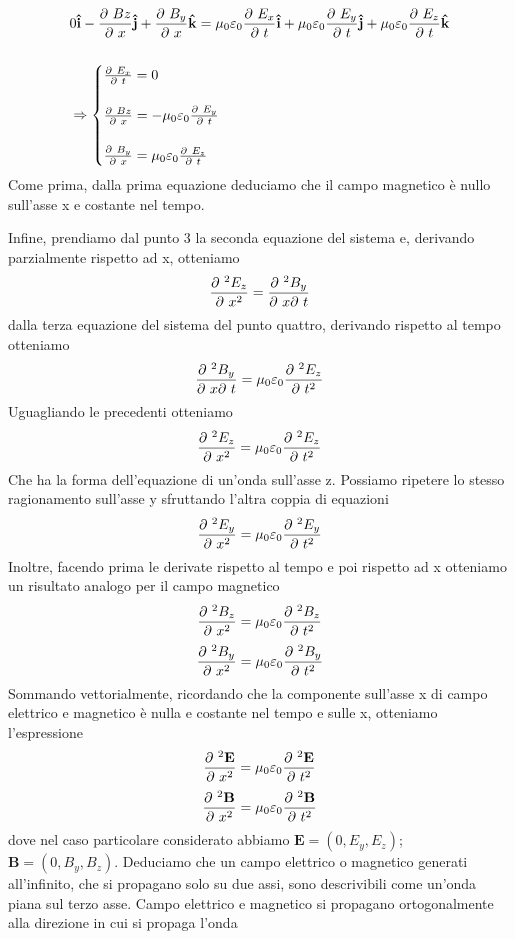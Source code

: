 \documentclass[
10pt, %
a4paper, %
oneside, %
headinclude,footinclude, %
BCOR5mm, %
]{scrartcl}
\begin{document}
\begin{itemize}
\begin{align*}
		&0\mathbf{\hat{i}}-\frac{\partial\  Bz}{\partial\  x}\mathbf{\hat{j}}+ \frac{\partial\  B_y}{\partial\  x}\mathbf{\hat{k}}=\mu_0\varepsilon_0\frac{\partial\  E_x}{\partial\  t}\mathbf{\hat{i}} + \mu_0\varepsilon_0\frac{\partial\  E_y}{\partial\  t}\mathbf{\hat{j}} +\mu_0\varepsilon_0\frac{\partial\  E_z}{\partial\  t}\mathbf{\hat{k}}\\\\
		&\Rightarrow
		\begin{cases}
			\frac{\partial\  E_x}{\partial\  t} = 0\\\\
			\frac{\partial\  Bz}{\partial\  x} = -\mu_0\varepsilon_0\frac{\partial\  E_y}{\partial\  t}\\\\
			\frac{\partial\  B_y}{\partial\  x} = \mu_0\varepsilon_0\frac{\partial\  E_z}{\partial\  t}
		\end{cases}		
	\end{align*}
	Come prima, dalla prima equazione deduciamo che il campo magnetico è nullo sull'asse x e costante nel tempo.
\end{itemize}
Infine, prendiamo dal punto 3 la seconda equazione del sistema e, derivando parzialmente rispetto ad x, otteniamo
\[\frac{\partial\ ^2 E_z}{\partial\  x^2} = \frac{\partial\ ^2 B_y}{\partial\  x\partial\  t} \]
dalla terza equazione del sistema del punto quattro, derivando rispetto al tempo otteniamo
\[\frac{\partial\ ^2 B_y}{\partial\  x\partial\  t} = \mu_0\varepsilon_0 \frac{\partial\ ^2 E_z}{\partial\  t^2}\] 
Uguagliando le precedenti otteniamo
\[\frac{\partial\ ^2 E_z}{\partial\  x^2}=\mu_0\varepsilon_0 \frac{\partial\ ^2 E_z}{\partial\  t^2}\]
Che ha la forma dell'equazione di un'onda sull'asse z. Possiamo ripetere lo stesso ragionamento sull'asse y sfruttando l'altra coppia di equazioni 
\[\frac{\partial\ ^2 E_y}{\partial\  x^2}=\mu_0\varepsilon_0 \frac{\partial\ ^2 E_y}{\partial\  t^2}\]
Inoltre, facendo prima le derivate rispetto al tempo e poi rispetto ad x otteniamo un risultato analogo per il campo magnetico
\[\frac{\partial\ ^2 B_z}{\partial\  x^2}=\mu_0\varepsilon_0 \frac{\partial\ ^2 B_z}{\partial\  t^2}\]
\[\frac{\partial\ ^2 B_y}{\partial\  x^2}=\mu_0\varepsilon_0 \frac{\partial\ ^2 B_y}{\partial\  t^2}\]
Sommando vettorialmente, ricordando che la componente sull'asse x di campo elettrico e magnetico è nulla e costante nel tempo e sulle x, otteniamo l'espressione
\[\frac{\partial\ ^2 \mathbf{E}}{\partial\  x^2}=\mu_0\varepsilon_0 \frac{\partial\ ^2 \mathbf{E}}{\partial\  t^2}\]
\[\frac{\partial\ ^2 \mathbf{B}}{\partial\  x^2}=\mu_0\varepsilon_0 \frac{\partial\ ^2 \mathbf{B}}{\partial\  t^2}\]
dove nel caso particolare considerato abbiamo \(\mathbf{E}=(0, E_y,E_z)\); \(\mathbf{B}=(0, B_y, B_z)\). Deduciamo che un campo elettrico o magnetico generati all'infinito, che si propagano solo su due assi, sono descrivibili come un'onda piana sul terzo asse. Campo elettrico e magnetico si propagano ortogonalmente alla direzione in cui si propaga l'onda
\end{document}
